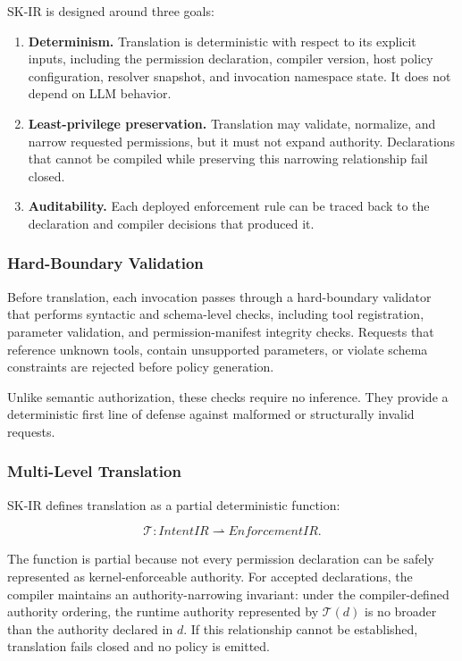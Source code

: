 SK-IR is designed around three goals:

\begin{enumerate}[leftmargin=1.2em]
\item \textbf{Determinism.}
Translation is deterministic with respect to its explicit inputs, including the
permission declaration, compiler version, host policy configuration, resolver
snapshot, and invocation namespace state. It does not depend on LLM behavior.

\item \textbf{Least-privilege preservation.}
Translation may validate, normalize, and narrow requested permissions, but it
must not expand authority. Declarations that cannot be compiled while
preserving this narrowing relationship fail closed.

\item \textbf{Auditability.}
Each deployed enforcement rule can be traced back to the declaration and
compiler decisions that produced it.
\end{enumerate}

\subsubsection{Hard-Boundary Validation}
\label{sec:design:ir:hard}

Before translation, each invocation passes through a hard-boundary validator
that performs syntactic and schema-level checks, including tool registration,
parameter validation, and permission-manifest integrity checks. Requests that
reference unknown tools, contain unsupported parameters, or violate schema
constraints are rejected before policy generation.

Unlike semantic authorization, these checks require no inference. They provide a
deterministic first line of defense against malformed or structurally invalid
requests.

\subsubsection{Multi-Level Translation}
\label{sec:design:ir:translation}

SK-IR defines translation as a partial deterministic function:

\[
\mathcal{T} : \textit{IntentIR} \rightharpoonup \textit{EnforcementIR}.
\]

\noindent The function is partial because not every permission declaration can
be safely represented as kernel-enforceable authority. For accepted
declarations, the compiler maintains an authority-narrowing invariant: under
the compiler-defined authority ordering, the runtime authority represented by
$\mathcal{T}(d)$ is no broader than the authority declared in $d$. If this
relationship cannot be established, translation fails closed and no policy is
emitted.

